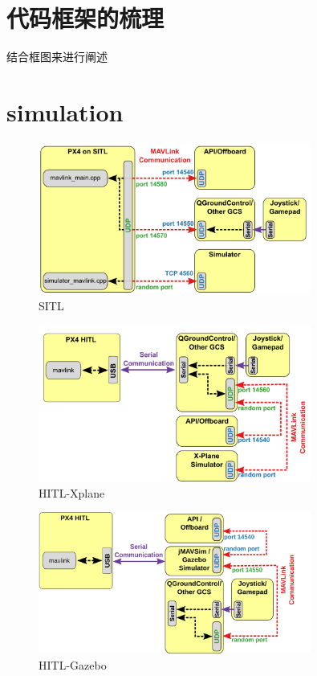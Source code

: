     \section{代码框架的梳理}
        结合框图来进行阐述
      
    \clearpage
    \section{simulation}
    \begin{figure}[htbp]
      \centering
      \includegraphics[width=0.8\textwidth]{pictures/chapter2/sitl.png}
      \caption{SITL}
    \end{figure}
    \begin{figure}[htbp]
      \centering
      \includegraphics[width=0.8\textwidth]{pictures/chapter2/hitl.png}
      \caption{HITL-Xplane}
    \end{figure}
    \begin{figure}[htbp]
      \centering
      \includegraphics[width=0.8\textwidth]{pictures/chapter2/hitl2.png}
      \caption{HITL-Gazebo}
    \end{figure}
    \clearpage
